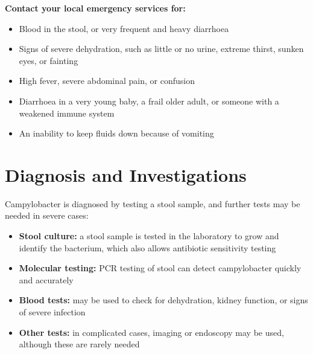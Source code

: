 \textbf{Contact your local emergency services for:}
\begin{itemize}
    \item Blood in the stool, or very frequent and heavy diarrhoea
    \item Signs of severe dehydration, such as little or no urine, extreme thirst, sunken eyes, or fainting
    \item High fever, severe abdominal pain, or confusion
    \item Diarrhoea in a very young baby, a frail older adult, or someone with a weakened immune system
    \item An inability to keep fluids down because of vomiting
\end{itemize}

\section*{Diagnosis and Investigations}
Campylobacter is diagnosed by testing a stool sample, and further tests may be needed in severe cases:
\begin{itemize}
    \item \textbf{Stool culture:} a stool sample is tested in the laboratory to grow and identify the bacterium, which also allows antibiotic sensitivity testing
    \item \textbf{Molecular testing:} PCR testing of stool can detect campylobacter quickly and accurately
    \item \textbf{Blood tests:} may be used to check for dehydration, kidney function, or signs of severe infection
    \item \textbf{Other tests:} in complicated cases, imaging or endoscopy may be used, although these are rarely needed
\end{itemize}

